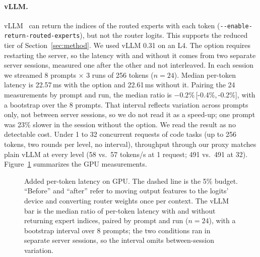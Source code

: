 \documentclass[11pt]{article}
\newcommand{\FZ}{\textsf{F0}}
\newcommand{\FZO}{\textsf{F0+F1}}
\newcommand{\ci}[2]{\,[#1,\,#2]}
\begin{document}
\paragraph{vLLM.}
vLLM~\citep{kwon2023efficient} can return the indices of the routed experts with each token (\texttt{-{}-enable-\allowbreak return-\allowbreak routed-\allowbreak experts}), but not the router logits.
This supports the reduced tier of Section~\ref{sec:method}.
We used vLLM 0.31 on an L4.
The option requires restarting the server, so the latency with and without it comes from two separate server sessions, measured one after the other and not interleaved.
In each session we streamed 8 prompts $\times$ 3 runs of 256 tokens ($n=24$).
Median per-token latency is 22.57\,ms with the option and 22.61\,ms without it.
Pairing the 24 measurements by prompt and run, the median ratio is $-0.2\%$\ci{-0.4\%}{-0.2\%}, with a bootstrap over the 8 prompts.
That interval reflects variation across prompts only, not between server sessions, so we do not read it as a speed-up; one prompt was 23\% slower in the session without the option.
We read the result as no detectable cost.
Under 1 to 32 concurrent requests of code tasks (up to 256 tokens, two rounds per level, no interval), throughput through our proxy matches plain vLLM at every level (58 vs.\ 57 tokens/s at 1 request; 491 vs.\ 491 at 32).
Figure~\ref{fig:latency} summarizes the GPU measurements.

\begin{figure}[t]
\centering
{}
\caption{Added per-token latency on GPU. The dashed line is the 5\% budget. ``Before'' and ``after'' refer to moving output features to the logits' device and converting router weights once per context. The vLLM bar is the median ratio of per-token latency with and without returning expert indices, paired by prompt and run ($n=24$), with a bootstrap interval over 8 prompts; the two conditions ran in separate server sessions, so the interval omits between-session variation.}
\label{fig:latency}
\end{figure}
\end{document}

